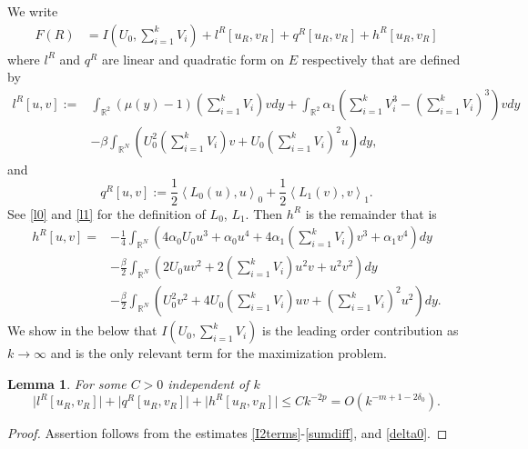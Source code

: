 \documentclass{amsart}
\newtheorem{lemma}[theorem]{Lemma}
\theoremstyle{definition}
\theoremstyle{remark}
\numberwithin{equation}{section}
\begin{document}
We write
\begin{equation}\begin{aligned}\label{FR}
F(R)&=I\left(U_{0}, \sum_{i=1}^{k} V_{i}\right)+l^R\left[u_{R}, v_{R}\right]+ q^R \left[u_{R}, v_{R}\right]+h^R\left[u_{R}, v_{R}\right]
\end{aligned}\end{equation}
where $l^R$ and $q^R$ are linear and quadratic form on $E$ respectively that are defined by
\begin{equation}
\begin{aligned}
l^R[u, v]:=& \int_{\mathbb{R}^{2}}(\mu(y)-1)\left(\sum_{i=1}^{k} V_{i}\right) v d y  +\int_{\mathbb{R}^{2}}\alpha_1\left(\sum_{i=1}^{k} V_{i}^{3}-\left(\sum_{i=1}^{k} V_{i}\right)^{3}\right) v d y \\
&-\beta \int_{\mathbb{R}^{N}}\left(U_{0}^{2}\left(\sum_{i=1}^{k} V_{i}\right) v+U_{0}\left(\sum_{i=1}^{k} V_{i}\right)^{2} u\right) d y,
\end{aligned}
\end{equation}
and $$q^R[u, v] := \frac{1}{2} \left<L_0(u),u\right>_0 + \frac{1}{2} \left<L_1(v),v\right>_1.$$
See \eqref{l0} and \eqref{l1} for the definition of $L_0$, $L_1$. Then $h^R$ is the remainder that is 
\begin{equation}
\begin{aligned}
h^R[u, v]=&-\frac{1}{4}\int_{\mathbb{R}^{N}}\left(4\alpha_0 U_{0} u^{3}+\alpha_0 u^{4}+4\alpha_1\left(\sum_{i=1}^{k} V_{i}\right) v^{3}+ \alpha_1 v^{4}\right) d y \\
&-\frac{\beta}{2} \int_{\mathbb{R}^{N}}\left(2U_{0} u v^{2}+2\left(\sum_{i=1}^{k} V_{i}\right) u^{2} v+u^2v^2\right) d y
\\
&-\frac{\beta}{2} \int_{\mathbb{R}^{N}}\left(U_{0}^{2} v^2+4U_{0}\left(\sum_{i=1}^{k} V_{i}\right) uv+\left(\sum_{i=1}^{k} V_{i}\right)^2u^2\right) d y.
\end{aligned}
\end{equation}
We show in the below that $I\left(U_{0}, \sum_{i=1}^{k} V_{i}\right)$ is the leading order contribution as $k \rightarrow \infty$ and is the only relevant term for the maximization problem.
\begin{lemma} For some $C>0$ independent of $k$
 $$\big|l^R[u_R,v_R]\big| + \big|q^R[u_R,v_R]\big| + \big|h^R[u_R,v_R]\big| \le C k^{-2p} = O\left(k^{-m +1 - 2\delta_0}\right).$$
\end{lemma}
\begin{proof}
 Assertion follows from the estimates \eqref{I2terms}-\eqref{sumdiff}, and \eqref{delta0}.
\end{proof}
\end{document}
